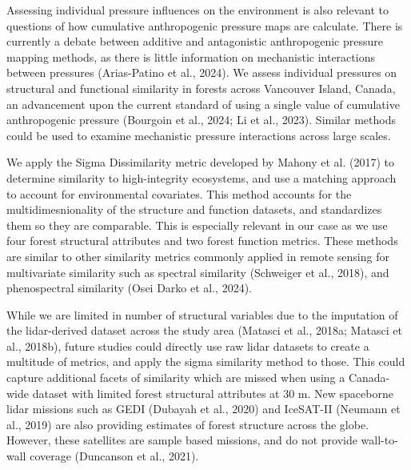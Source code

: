 \documentclass[
]{agujournal2019}
\begin{document}
Assessing individual pressure influences on the environment is also
relevant to questions of how cumulative anthropogenic pressure maps are
calculate. There is currently a debate between additive and antagonistic
anthropogenic pressure mapping methods, as there is little information
on mechanistic interactions between pressures (Arias-Patino et al.,
2024). We assess individual pressures on structural and functional
similarity in forests across Vancouver Island, Canada, an advancement
upon the current standard of using a single value of cumulative
anthropogenic pressure (Bourgoin et al., 2024; Li et al., 2023). Similar
methods could be used to examine mechanistic pressure interactions
across large scales.

We apply the Sigma Dissimilarity metric developed by Mahony et al.
(2017) to determine similarity to high-integrity ecosystems, and use a
matching approach to account for environmental covariates. This method
accounts for the multidimesnionality of the structure and function
datasets, and standardizes them so they are comparable. This is
especially relevant in our case as we use four forest structural
attributes and two forest function metrics. These methods are similar to
other similarity metrics commonly applied in remote sensing for
multivariate similarity such as spectral similarity (Schweiger et al.,
2018), and phenospectral similarity (Osei Darko et al., 2024).

While we are limited in number of structural variables due to the
imputation of the lidar-derived dataset across the study area (Matasci
et al., 2018a; Matasci et al., 2018b), future studies could directly use
raw lidar datasets to create a multitude of metrics, and apply the sigma
similarity method to those. This could capture additional facets of
similarity which are missed when using a Canada-wide dataset with
limited forest structural attributes at 30 m. New spaceborne lidar
missions such as GEDI (Dubayah et al., 2020) and IceSAT-II (Neumann et
al., 2019) are also providing estimates of forest structure across the
globe. However, these satellites are sample based missions, and do not
provide wall-to-wall coverage (Duncanson et al., 2021).
\end{document}
